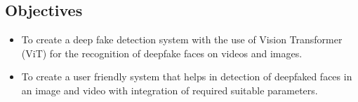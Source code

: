 \subsection{Objectives}
\justify
\begin{itemize}
    \item To create a deep fake detection system with the use of Vision Transformer (ViT) for the recognition of deepfake faces on videos and images.
    \item To create a user friendly system that helps in detection of deepfaked faces in an image and video with integration of required suitable parameters.
\end{itemize}
